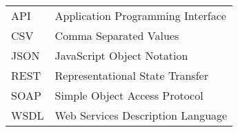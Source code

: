 
\seznamzkr

\begin{tabular}{ll}
  API	& Application Programming Interface	\\
  CSV	& Comma Separated Values			\\
  JSON	& JavaScript Object Notation		\\
  REST	& Representational State Transfer	\\
  SOAP	& Simple Object Access Protocol 	\\
  WSDL	& Web Services Description Language	\\
\end{tabular}

